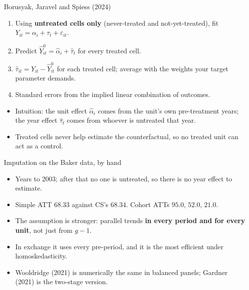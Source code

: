 \documentclass[
  11pt,
  ignorenonframetext,
  aspectratio=169,
]{beamer}
\providecommand{\tightlist}{%
  \setlength{\itemsep}{0pt}\setlength{\parskip}{0pt}}
\begin{document}
\begin{frame}{Borusyak, Jaravel and Spiess (2024)}
\protect{}\label{borusyak-jaravel-and-spiess-2024}
\begin{enumerate}
\tightlist
\item
  Using \textbf{untreated cells only} (never-treated and
  not-yet-treated), fit
  \(Y_{it} = \alpha_i + \tau_t + \varepsilon_{it}\).
\item
  Predict \(\hat Y^0_{it} = \hat\alpha_i + \hat\tau_t\) for every
  treated cell.
\item
  \(\hat\tau_{it} = Y_{it} - \hat Y^0_{it}\) for each treated cell;
  average with the weights your target parameter demands.
\item
  Standard errors from the implied linear combination of outcomes.
\end{enumerate}

\vspace{0.4em}

\begin{itemize}
\tightlist
\item
  Intuition: the unit effect \(\hat\alpha_i\) comes from the unit's own
  pre-treatment years; the year effect \(\hat\tau_t\) comes from whoever
  is untreated that year.
\item
  Treated cells never help estimate the counterfactual, so no treated
  unit can act as a control.
\end{itemize}
\end{frame}

\begin{frame}{Imputation on the Baker data, by hand}
\protect{}\label{imputation-on-the-baker-data-by-hand}
\begin{itemize}
\tightlist
\item
  Years to 2003; after that no one is untreated, so there is no year
  effect to estimate.
\item
  Simple ATT \(68.33\) against CS's \(68.34\). Cohort ATTs \(95.0\),
  \(52.0\), \(21.0\).
\end{itemize}

\vspace{0.4em}

\begin{itemize}
\tightlist
\item
  The assumption is stronger: parallel trends \textbf{in every period
  and for every unit}, not just from \(g - 1\).
\item
  In exchange it uses every pre-period, and it is the most efficient
  under homoskedasticity.
\item
  Wooldridge (2021) is numerically the same in balanced panels; Gardner
  (2021) is the two-stage version.
\end{itemize}
\end{frame}
\end{document}
